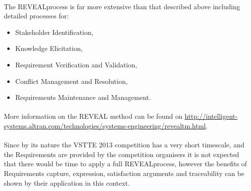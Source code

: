\paragraph{}The REVEAL\texttrademark process is far more extensive than that described above including detailed processes for:
	\begin{itemize}
          \item Stakeholder Identification, 
          \item Knowledge Elicitation, 
          \item Requirement Verification and Validation,
          \item Conflict Management and Resolution,
          \item Requirements Maintenance and Management.
        \end{itemize}

\paragraph{}More information on the REVEAL method can be found on \url{http://intelligent-systems.altran.com/technologies/systems-engineering/revealtm.html}.

\paragraph{}Since by its nature the VSTTE 2013 competition has a very short timescale, and the Requirements are provided by the competition organisers it is not expected that there would be time to apply a full REVEAL\texttrademark process, however the benefits of Requirements capture, expression, satisfaction arguments and traceability can be shown by their application in this context.

